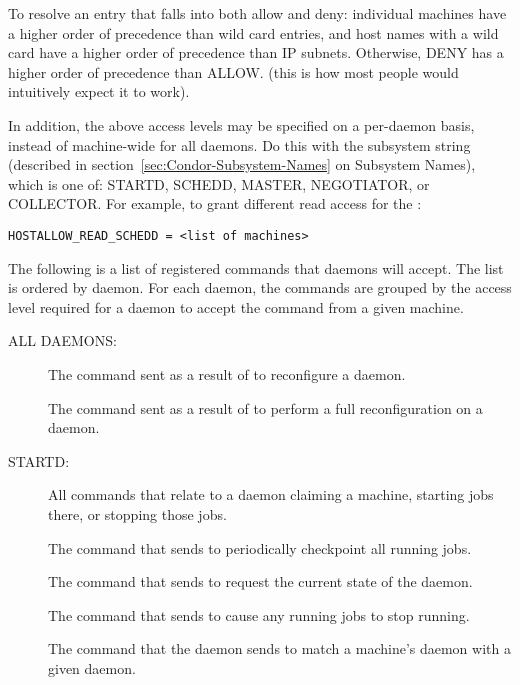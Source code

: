 To resolve an entry that falls into both allow and deny:
individual
machines have a higher order of precedence than wild card entries, and
host names with a wild card have a higher order of precedence than IP
subnets.
Otherwise, DENY has a higher order of precedence than ALLOW.
(this is how most people would intuitively expect it to work).  

In addition, the above access levels may be specified on a
per-daemon basis, instead of machine-wide for all daemons.
Do this with the subsystem string (described in
section~\ref{sec:Condor-Subsystem-Names} on Subsystem Names),
which is one of: STARTD, SCHEDD, MASTER, NEGOTIATOR,
or COLLECTOR.
For example, to grant different read access for the :
\footnotesize
\begin{verbatim}
HOSTALLOW_READ_SCHEDD = <list of machines>
\end{verbatim}
\normalsize

The following is a list of registered commands that daemons will
accept.  The list is ordered by daemon.
For each daemon, the commands are grouped by the access level
required for a daemon to accept the command from a
given machine.

ALL DAEMONS:

\begin{description}
\item[]

  The command sent as a result of  to reconfigure a daemon.

\item[]

  The command sent as a result of 
  to perform a full reconfiguration on a daemon. 
\end{description}

STARTD:

\begin{description}
\item[] 

All commands that relate to a  daemon claiming
  a machine, starting jobs there, or stopping those jobs.

The command that  sends to periodically checkpoint
  all running jobs.

\item[]

The command that  sends to request the
  current state of the  daemon.

\item[]
The command that  sends to cause
  any running jobs to stop running.

\item[]
The command that the  daemon sends to
  match a machine's  daemon with a given 
  daemon.
\end{description}

